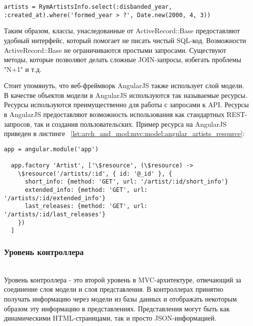 \begin{lstlisting}[style=fsharpstyle,caption={Пример получения артистов по определённым параметрам}, label=lst:arch_and_mod:mvc:model:select_artist_where_year]
  artists = RymArtistsInfo.select(:disbanded_year, :created_at).where('formed_year > ?', Date.new(2000, 4, 3))
\end{lstlisting}

Таким образом, классы, унаследованные от ActiveRecord::Base предоставляют удобный интерфейс, который помогает не писать чистый SQL-код. Возможности ActiveRecord::Base не ограничиваются простыми запросами. Существуют методы, которые позволяют делать сложные JOIN-запросы, избегать проблемы "N+1" и т.д.

Стоит упомянуть, что веб-фреймворк AngularJS также использует слой модели. В качестве объектов модели в AngularJS используются так называемые ресурсы. Ресурсы используются преимущественно для работы с запросами к API. Ресурсы в AngularJS предоставляют возможность использования как стандартных REST-запросов, так и создания пользовательских. Пример ресурса на AngularJS приведен в листинге ~\ref{lst:arch_and_mod:mvc:model:angular_artists_resource}:

\begin{lstlisting}[style=fsharpstyle,caption={Пример получения артистов по определённым параметрам}, label=lst:arch_and_mod:mvc:model:angular_artists_resource]
  app = angular.module('app')

  app.factory 'Artist', ['\$resource', (\$resource) ->
    \$resource('/artists/:id', { id: '@_id' }, {
      short_info: {method: 'GET', url: '/artist/:id/short_info'}
      extended_info: {method: 'GET', url: '/artists/:id/extended_info'}
      last_releases: {method: 'GET', url: '/artists/:id/last_releases'}
    })
  ]
\end{lstlisting}

\subsubsection{Уровень контроллера}
\label{sub:arch_and_mod:mvc:controller}
~\\

Уровень контроллера - это второй уровень в MVC-архитектуре, отвечающий за соединение слоя модели и слоя представления. В контроллерах принятно получать информацию через модели из базы данных и отображать некоторым образом эту информацию в представлениях. Представления могут быть как динамическими HTML-страницами, так и просто JSON-информацией.

